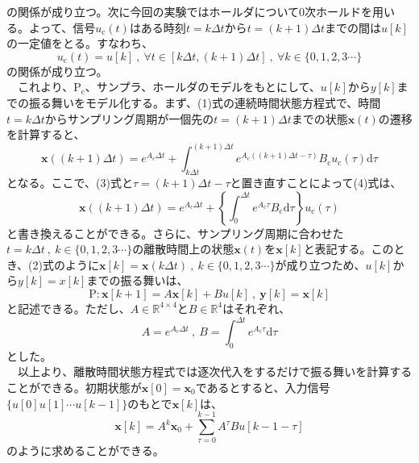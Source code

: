 \documentclass[a4paper,10.5pt]{ltjsarticle}
\begin{document}
の関係が成り立つ。次に今回の実験ではホールダについて0次ホールドを用いる。よって、信号$u_\mathrm{c}(t)$はある時刻$t=k\Delta t$から$t=(k+1)\Delta t$までの間は$u[k]$の一定値をとる。すなわち、
\begin{equation}
  u_\mathrm{c}(t)=u[k]\ ,\ \forall t\in[k\Delta t,(k+1)\Delta t]\ ,\ \forall k\in\{0,1,2,3\cdots\}
\end{equation}
の関係が成り立つ。\\
　これより、$\mathrm{P_c}$、サンプラ、ホールダのモデルをもとにして、$u[k]$から$y[k]$までの振る舞いをモデル化する。まず、(1)式の連続時間状態方程式で、時間$t=k\Delta t$からサンプリング周期が一個先の$t=(k+1)\Delta t$までの状態$\bm x(t)$の遷移を計算すると、
\begin{equation}
  \bm x((k+1)\Delta t)=e^{A_\mathrm{c}\Delta t}+\int_{k\Delta t}^{(k+1)\Delta t} e^{A_\mathrm{c}((k+1)\Delta t-\tau)}B_\mathrm{c}u_\mathrm{c}(\tau)\mathrm{d}\tau
\end{equation}
となる。ここで、(3)式と$\tau=(k+1)\Delta t-\tau$と置き直すことによって(4)式は、
\begin{equation}
  \bm x((k+1)\Delta t)=e^{A_\mathrm{c}\Delta t}+\left\{\int_{0}^{\Delta t} e^{A_\mathrm{c}\tau}B_\mathrm{c}\mathrm{d}\tau\right\}u_\mathrm{c}(\tau)
\end{equation}
と書き換えることができる。さらに、サンプリング周期に合わせた$t=k\Delta t\ ,\ k\in\{0,1,2,3\cdots\}$の離散時間上の状態$\bm x(t)$を$\bm x[k]$と表記する。このとき、(2)式のように$\bm x[k]=\bm x(k\Delta t)\ ,\ k\in \{0,1,2,3\cdots\}$が成り立つため、$u[k]$から$y[k]=x[k]$までの振る舞いは、
\begin{equation}
  \mathrm{P}:\bm x[k+1]=A\bm x[k]+Bu[k]\ ,\ \bm y[k]=\bm x[k]
\end{equation}
と記述できる。ただし、$A\in \mathbb{R}^{4\times4}$と$B\in \mathbb{R}^{4}$はそれぞれ、
\begin{equation}
  A=e^{A_\mathrm{c}\Delta t}\ ,\ B=\int_{0}^{\Delta t}e^{A_\mathrm{c}\tau}\mathrm{d}\tau
\end{equation}
とした。\\
　以上より、離散時間状態方程式では逐次代入をするだけで振る舞いを計算することができる。初期状態が$\bm x[0]=\bm x_0$であるとすると、入力信号$\{u[0]u[1]\cdots u[k-1]\}$のもとで$\bm x[k]$は、
\begin{equation}
  \bm x[k]=A^k\bm x_0+\sum^{k-1}_{\tau=0}A^{\tau}Bu[k-1-\tau]
\end{equation}
のように求めることができる。
\clearpage
\end{document}
